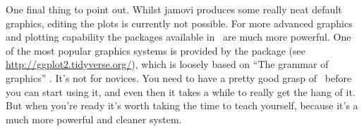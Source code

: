 One final thing to point out. Whilst jamovi produces some really neat default graphics, editing the plots is currently not possible. For more advanced graphics and plotting capability the packages available in \R\ are much more powerful. One of the most popular graphics systems is provided by the  package (see \url{http://ggplot2.tidyverse.org/}), which is loosely based on ``The grammar of graphics'' \parencite{Wilkinson2006}. It's not for novices. You need to have a pretty good grasp of \R\ before you can start using it, and even then it takes a while to really get the hang of it. But when you're ready it's worth taking the time to teach yourself, because it's a much more powerful and cleaner system.





